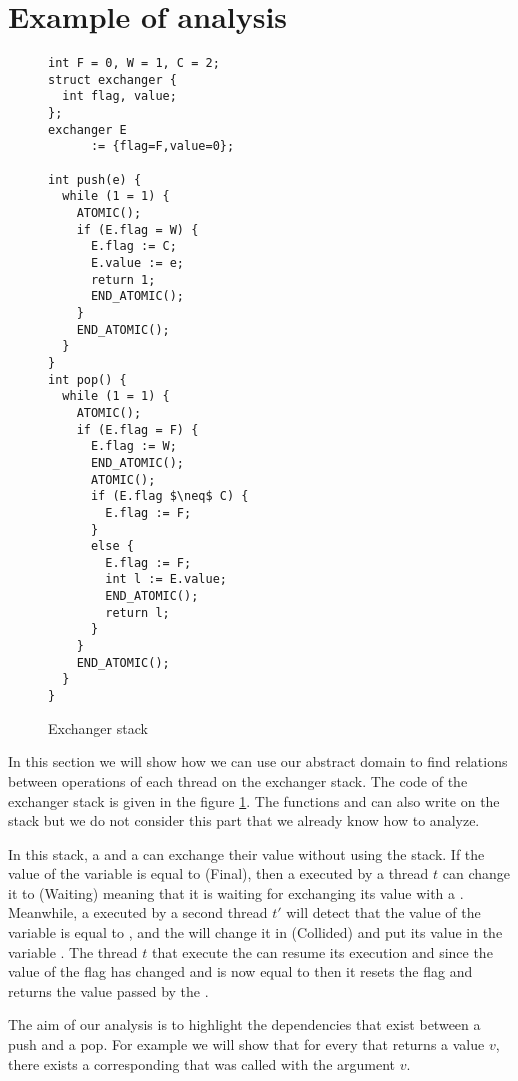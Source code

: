 \section{Example of analysis}
\label{sec:example}

\begin{figure}
\begin{multicols}{2}
\begin{lstlisting}
int F = 0, W = 1, C = 2;
struct exchanger {
  int flag, value;
};
exchanger E 
      := {flag=F,value=0};

int push(e) {
  while (1 = 1) {
    ATOMIC();
    if (E.flag = W) {
      E.flag := C;
      E.value := e;
      return 1;
      END_ATOMIC();
    }
    END_ATOMIC();
  }
}
int pop() {
  while (1 = 1) {
    ATOMIC();
    if (E.flag = F) {
      E.flag := W;
      END_ATOMIC();
      ATOMIC();
      if (E.flag $\neq$ C) {
        E.flag := F;
      }
      else {
        E.flag := F;
        int l := E.value;
        END_ATOMIC();
        return l;
      }
    }
    END_ATOMIC();
  }
}
\end{lstlisting}
\end{multicols}
\caption{Exchanger stack}
\label{fig:exchangerstack}
\end{figure}


In this section we will show how we can use our abstract domain to find relations between operations of each thread on the exchanger stack. The code of the exchanger stack is given in the figure \ref{fig:exchangerstack}. 
The functions  and  can also write on the stack but we do not consider this part that we already know how to analyze. 

In this stack, a  and a  can exchange their value without using the stack. If the value of the variable  is equal to  (Final), then a  executed by a thread $t$ can change it to  (Waiting) meaning that it is waiting for exchanging its value with a . 
Meanwhile, a  executed by a second thread $t'$ will detect that the value of the  variable is equal to , and the  will change it in  (Collided) and put its value  in the variable . 
The thread $t$ that execute the  can resume its execution and since the value of the flag has changed and is now equal to  then it resets the flag and returns the value passed by the . 

The aim of our analysis is to highlight the dependencies that exist between a push and a pop. For example we will show that for every  that returns a value $v$, there exists a corresponding  that was called with the argument $v$.



